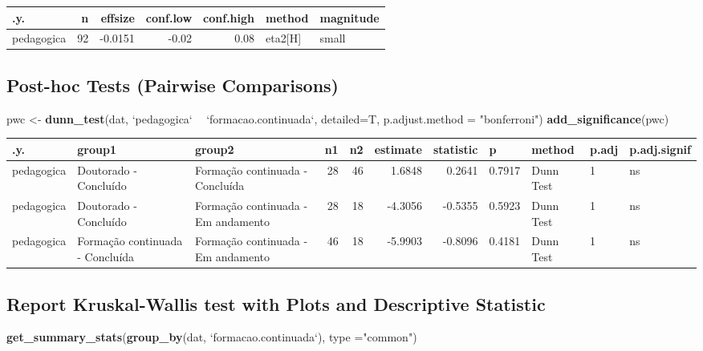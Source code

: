 \documentclass[]{article}
\newenvironment{Shaded}{\begin{snugshade}}{\end{snugshade}}
\newcommand{\DataTypeTok}[1]{\textcolor[rgb]{0.13,0.29,0.53}{#1}}
\newcommand{\KeywordTok}[1]{\textcolor[rgb]{0.13,0.29,0.53}{\textbf{#1}}}
\newcommand{\NormalTok}[1]{#1}
\newcommand{\OperatorTok}[1]{\textcolor[rgb]{0.81,0.36,0.00}{\textbf{#1}}}
\newcommand{\StringTok}[1]{\textcolor[rgb]{0.31,0.60,0.02}{#1}}
\begin{document}
\begin{longtable}[]{@{}lrrrrll@{}}
\toprule
.y. & n & effsize & conf.low & conf.high & method &
magnitude\tabularnewline
\midrule
\endhead
pedagogica & 92 & -0.0151 & -0.02 & 0.08 & eta2{[}H{]} &
small\tabularnewline
\bottomrule
\end{longtable}

\hypertarget{post-hoc-tests-pairwise-comparisons}{%
\subsection{Post-hoc Tests (Pairwise
Comparisons)}\label{post-hoc-tests-pairwise-comparisons}}

\begin{Shaded}
\begin{Highlighting}[]
\NormalTok{pwc <-}\StringTok{ }\KeywordTok{dunn_test}\NormalTok{(dat, }\StringTok{`}\DataTypeTok{pedagogica}\StringTok{`} \OperatorTok{~}\StringTok{ `}\DataTypeTok{formacao.continuada}\StringTok{`}\NormalTok{, }\DataTypeTok{detailed=}\NormalTok{T, }\DataTypeTok{p.adjust.method =} \StringTok{"bonferroni"}\NormalTok{)}
\KeywordTok{add_significance}\NormalTok{(pwc)}
\end{Highlighting}
\end{Shaded}

\begin{longtable}[]{@{}lllrrrrllll@{}}
\toprule
.y. & group1 & group2 & n1 & n2 & estimate & statistic & p & method &
p.adj & p.adj.signif\tabularnewline
\midrule
\endhead
pedagogica & Doutorado - Concluído & Formação continuada - Concluída &
28 & 46 & 1.6848 & 0.2641 & 0.7917 & Dunn Test & 1 & ns\tabularnewline
pedagogica & Doutorado - Concluído & Formação continuada - Em andamento
& 28 & 18 & -4.3056 & -0.5355 & 0.5923 & Dunn Test & 1 &
ns\tabularnewline
pedagogica & Formação continuada - Concluída & Formação continuada - Em
andamento & 46 & 18 & -5.9903 & -0.8096 & 0.4181 & Dunn Test & 1 &
ns\tabularnewline
\bottomrule
\end{longtable}

\hypertarget{report-kruskal-wallis-test-with-plots-and-descriptive-statistic}{%
\subsection{Report Kruskal-Wallis test with Plots and Descriptive
Statistic}\label{report-kruskal-wallis-test-with-plots-and-descriptive-statistic}}

\begin{Shaded}
\begin{Highlighting}[]
\KeywordTok{get_summary_stats}\NormalTok{(}\KeywordTok{group_by}\NormalTok{(dat, }\StringTok{`}\DataTypeTok{formacao.continuada}\StringTok{`}\NormalTok{), }\DataTypeTok{type =}\StringTok{"common"}\NormalTok{)}
\end{Highlighting}
\end{Shaded}
\end{document}
